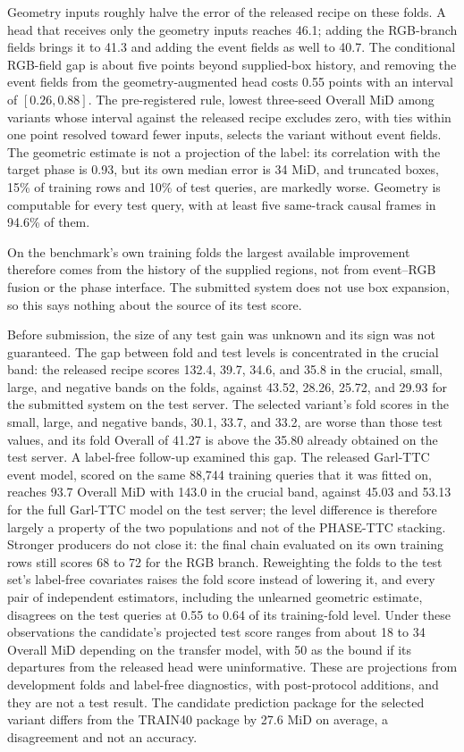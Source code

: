Geometry inputs roughly halve the error of the released recipe on these folds. A head that receives only the geometry inputs reaches 46.1; adding the RGB-branch fields brings it to 41.3 and adding the event fields as well to 40.7. The conditional RGB-field gap is about five points beyond supplied-box history, and removing the event fields from the geometry-augmented head costs 0.55 points with an interval of $[0.26,0.88]$. The pre-registered rule, lowest three-seed Overall MiD among variants whose interval against the released recipe excludes zero, with ties within one point resolved toward fewer inputs, selects the variant without event fields. The geometric estimate is not a projection of the label: its correlation with the target phase is 0.93, but its own median error is 34 MiD, and truncated boxes, 15\% of training rows and 10\% of test queries, are markedly worse. Geometry is computable for every test query, with at least five same-track causal frames in 94.6\% of them.

On the benchmark's own training folds the largest available improvement therefore comes from the history of the supplied regions, not from event--RGB fusion or the phase interface. The submitted system does not use box expansion, so this says nothing about the source of its test score.

Before submission, the size of any test gain was unknown and its sign was not guaranteed. The gap between fold and test levels is concentrated in the crucial band: the released recipe scores 132.4, 39.7, 34.6, and 35.8 in the crucial, small, large, and negative bands on the folds, against 43.52, 28.26, 25.72, and 29.93 for the submitted system on the test server. The selected variant's fold scores in the small, large, and negative bands, 30.1, 33.7, and 33.2, are worse than those test values, and its fold Overall of 41.27 is above the 35.80 already obtained on the test server. A label-free follow-up examined this gap. The released Garl-TTC event model, scored on the same 88,744 training queries that it was fitted on, reaches 93.7 Overall MiD with 143.0 in the crucial band, against 45.03 and 53.13 for the full Garl-TTC model on the test server; the level difference is therefore largely a property of the two populations and not of the PHASE-TTC stacking. Stronger producers do not close it: the final chain evaluated on its own training rows still scores 68 to 72 for the RGB branch. Reweighting the folds to the test set's label-free covariates raises the fold score instead of lowering it, and every pair of independent estimators, including the unlearned geometric estimate, disagrees on the test queries at 0.55 to 0.64 of its training-fold level. Under these observations the candidate's projected test score ranges from about 18 to 34 Overall MiD depending on the transfer model, with 50 as the bound if its departures from the released head were uninformative. These are projections from development folds and label-free diagnostics, with post-protocol additions, and they are not a test result. The candidate prediction package for the selected variant differs from the TRAIN40 package by 27.6 MiD on average, a disagreement and not an accuracy.

